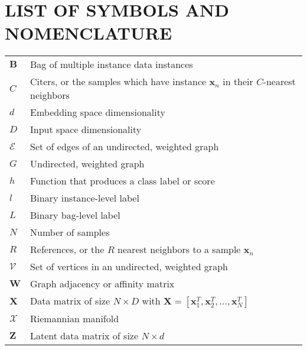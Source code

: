 

\chapter*{LIST OF SYMBOLS AND NOMENCLATURE}  %
\singlespacing
\begin{longtable}{l p{5in}} %

$\bm{B}$ & Bag of  multiple instance data instances \\
$C$ & Citers, or the samples which have instance $\bm{x}_{n}$ in their $C$-nearest neighbors\\
$d$ & Embedding space dimensionality\\
$D$ & Input space dimensionality\\
$\mathcal{E}$ & Set of edges of an undirected, weighted graph\\
$G$ & Undirected, weighted graph\\ 
$h$ & Function that produces a class label or score\\
$l$ & Binary instance-level label\\
$L$ & Binary bag-level label \\
$N$ & Number of samples\\
$R$ & References, or the $R$ nearest neighbors to a sample $\bm{x}_{n}$\\
$\mathcal{V}$ & Set of vertices in an undirected, weighted graph\\ 
$\bm{W}$ & Graph adjacency or affinity matrix\\
$\bm{X}$ & Data matrix of size $N \times D$ with $\bm{X} = [\bm{x}^{T}_{1}, \bm{x}^{T}_{2}, \dots, \bm{x}^{T}_{N}]$\\
$\mathcal{X}$ & Riemannian manifold\\
$\bm{Z}$ & Latent data matrix of size $N \times d$\\

\end{longtable}


\doublespacing

